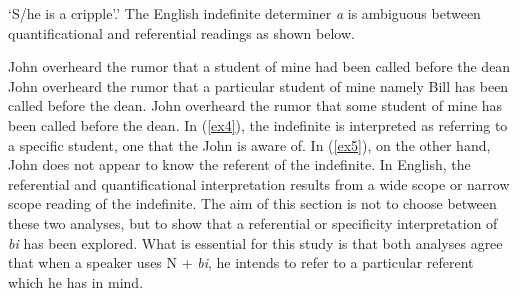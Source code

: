 \documentclass[output=paper,
modfonts
]{langsci/langscibook}
\begin{document}
\glt ‘S/he is a cripple’.'
\z \z The English indefinite determiner \emph{a} is ambiguous between quantificational and referential readings as shown below.
\ea
{}\\
\ea\label{ex3}

John overheard the rumor that a student of mine had been called before the dean
\ea \label{ex4} John overheard the rumor that a particular student of mine namely Bill has been called before the dean.
\ex \label{ex5} John overheard the rumor that some student of mine has been called before the dean.
\z\z 
\z In (\ref{ex4}), the indefinite is interpreted as referring to a specific student, one that the John is aware of. In (\ref{ex5}), on the other hand, John does not appear to know the referent of the indefinite. In English, the referential and quantificational interpretation results from a wide scope or narrow scope reading of the indefinite. 
The aim of this section is not to choose between these two analyses, but to show that a referential or specificity interpretation of \emph{bi} has been explored. What is essential for this study is that both analyses agree that when a speaker uses  N + \emph{bi}, he intends to refer to a particular referent which he has in mind.            
\end{document}
